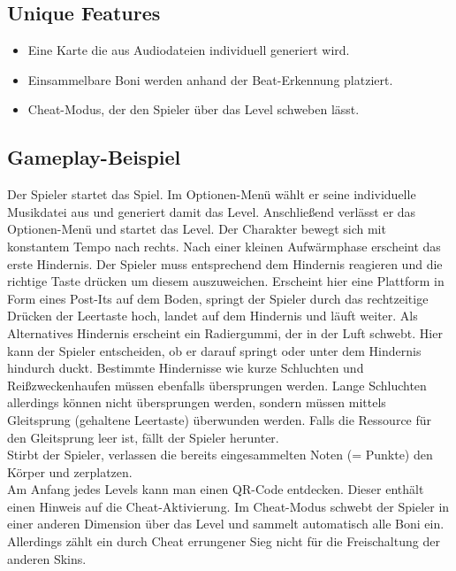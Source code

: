 \documentclass[Skript.tex]{subfiles}
\begin{document}
\subsection{Unique Features}

\begin{itemize}
\item Eine Karte die aus Audiodateien individuell generiert wird.
\item Einsammelbare Boni werden anhand der Beat-Erkennung platziert.
\item Cheat-Modus, der den Spieler über das Level schweben lässt.
\end{itemize}


\subsection{Gameplay-Beispiel}

Der Spieler startet das Spiel.
Im Optionen-Menü wählt er seine individuelle Musikdatei aus und generiert damit das Level. 
Anschließend verlässt er das Optionen-Menü und startet das Level.
Der Charakter bewegt sich mit konstantem Tempo nach rechts.
Nach einer kleinen Aufwärmphase erscheint das erste Hindernis.
Der Spieler muss entsprechend dem Hindernis reagieren und die richtige Taste drücken um diesem auszuweichen.
Erscheint hier eine Plattform in Form eines Post-Its auf dem Boden, springt der Spieler durch das rechtzeitige Drücken der Leertaste hoch, landet auf dem Hindernis und läuft weiter.
Als Alternatives Hindernis erscheint ein Radiergummi, der in der Luft schwebt.
Hier kann der Spieler entscheiden, ob er darauf springt oder unter dem Hindernis hindurch duckt.
Bestimmte Hindernisse wie kurze Schluchten und Reißzweckenhaufen müssen ebenfalls übersprungen werden.
Lange Schluchten allerdings können nicht übersprungen werden, sondern müssen mittels Gleitsprung (gehaltene Leertaste) überwunden werden.
Falls die Ressource für den Gleitsprung leer ist, fällt der Spieler herunter.\\

Stirbt der Spieler, verlassen die bereits eingesammelten Noten (= Punkte) den Körper und zerplatzen.\\

Am Anfang jedes Levels kann man einen QR-Code entdecken.
Dieser enthält einen Hinweis auf die Cheat-Aktivierung.
Im Cheat-Modus schwebt der Spieler in einer anderen Dimension über das Level und sammelt automatisch alle Boni ein.
Allerdings zählt ein durch Cheat errungener Sieg nicht für die Freischaltung der anderen Skins.
\end{document}
